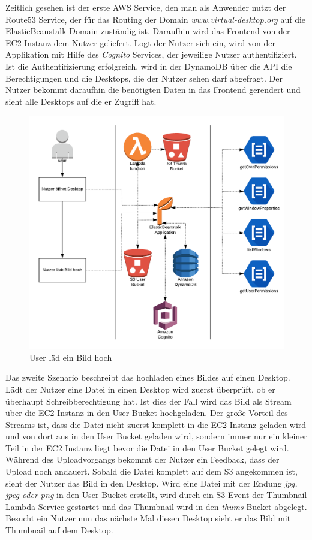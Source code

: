 \documentclass[a4paper, 12pt]{scrreprt}
\renewcommand\_{\textunderscore\allowbreak}
\begin{document}
Zeitlich gesehen ist der erste AWS Service, den man als Anwender nutzt der Route53 Service, der für das Routing der Domain \textit{www.virtual-desktop.org} auf die ElasticBeanstalk Domain zuständig ist. Daraufhin wird das Frontend von der EC2 Instanz dem Nutzer geliefert. Logt der Nutzer sich ein, wird von der Applikation mit Hilfe des \textit{Cognito} Services, der jeweilige Nutzer authentifiziert. Ist die Authentifizierung erfolgreich, wird in der DynamoDB über die API die Berechtigungen und die Desktops, die der Nutzer sehen darf abgefragt. Der Nutzer bekommt daraufhin die benötigten Daten in das Frontend gerendert und sieht alle Desktops auf die er Zugriff hat. \\

\begin{figure}[h]
\centering
\includegraphics[scale=0.6]{Flow-Dia-12.png}
\caption{User läd ein Bild hoch}
\end{figure}

Das zweite Szenario beschreibt das hochladen eines Bildes auf einen Desktop. Lädt der Nutzer eine Datei in einen Desktop wird zuerst überprüft, ob er überhaupt Schreibberechtigung hat. Ist dies der Fall wird das Bild als Stream über die EC2 Instanz in den User Bucket hochgeladen. Der große Vorteil des Streams ist, dass die Datei nicht zuerst komplett in die EC2 Instanz geladen wird und von dort aus in den User Bucket geladen wird, sondern immer nur ein kleiner Teil in der EC2 Instanz liegt bevor die Datei in den User Bucket gelegt wird. Während des Uploadvorgangs bekommt der Nutzer ein Feedback, dass der Upload noch andauert. Sobald die Datei komplett auf dem S3 angekommen ist, sieht der Nutzer das Bild in den Desktop. Wird eine Datei mit der Endung \textit{jpg, jpeg oder png} in den User Bucket erstellt, wird durch ein S3 Event der Thumbnail Lambda Service gestartet und das Thumbnail wird in den \textit{thums} Bucket abgelegt. Besucht ein Nutzer nun das nächste Mal diesen Desktop sieht er das Bild mit Thumbnail auf dem Desktop.
\end{document}
